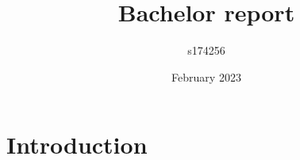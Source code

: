 \documentclass{article}
\title{Bachelor report}
\author{s174256 }
\date{February 2023}
\begin{document}
\maketitle

\section{Introduction}
\end{document}
